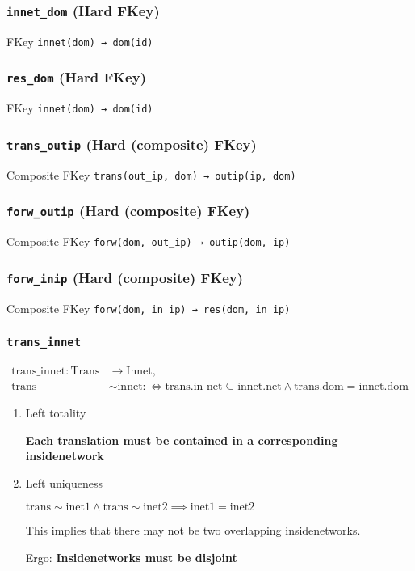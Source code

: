 \documentclass[11pt]{article}
\begin{document}
\subsubsection{\texttt{innet\_dom} (Hard FKey)}
\label{sec:orgdca99e4}
FKey \texttt{innet(dom) → dom(id)}

\subsubsection{\texttt{res\_dom} (Hard FKey)}
\label{sec:org6fda4e3}
FKey \texttt{innet(dom) → dom(id)}

\subsubsection{\texttt{trans\_outip} (Hard (composite) FKey)}
\label{sec:org66b164b}
Composite FKey \texttt{trans(out\_ip, dom) → outip(ip, dom)}

\subsubsection{\texttt{forw\_outip} (Hard (composite) FKey)}
\label{sec:org97c9d82}
Composite FKey \texttt{forw(dom, out\_ip) → outip(dom, ip)}

\subsubsection{\texttt{forw\_inip} (Hard (composite) FKey)}
\label{sec:org49d9eb0}
Composite FKey \texttt{forw(dom, in\_ip) → res(dom, in\_ip)}

\subsubsection{\texttt{trans\_innet}}
\label{sec:org8792d72}
\begin{align*}
\mathrm{trans\_innet}\colon \mathrm{Trans} &\to \mathrm{Innet},\\
\text{trans} &\sim \text{innet} :\Leftrightarrow \text{trans.in\_net} \subseteq \text{innet.net} \wedge \text{trans.dom} = \text{innet.dom}
\end{align*}

\begin{enumerate}
\item Left totality
\label{sec:org3bd645b}

\textbf{\textbf{Each translation must be contained in a corresponding insidenetwork}}

\item Left uniqueness
\label{sec:org1514295}

\(\text{trans}\sim \text{inet1} \wedge \text{trans}\sim \text{inet2} \implies \text{inet1} = \text{inet2}\)

This implies that there may not be two overlapping insidenetworks.

Ergo:  \textbf{\textbf{Insidenetworks must be disjoint}}
\end{enumerate}
\end{document}
